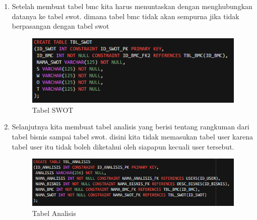 \begin{enumerate}
\item Setelah membuat tabel bmc kita harus menuntaskan dengan menghubungkan datanya ke tabel swot. dimana tabel bmc tidak akan sempurna jika tidak berpasangan dengan tabel swot
\begin{figure}[H]
\centering
\caption{Tabel SWOT}
\includegraphics[witdh=1\textwidth]{figures/28.png}
\end{figure}

\item Selanjutnya kita membuat tabel analisis yang berisi tentang rangkuman dari tabel bisnis sampai tabel swot. disini kita tidak memasukan tabel user karena tabel user itu tidak boleh diketahui oleh siapapun kecuali user tersebut. 
\begin{figure}[H]
\centering
\caption{Tabel Analisis}
\includegraphics[witdh=1\textwidth]{figures/29.png}
\end{figure}


\end{enumerate}
